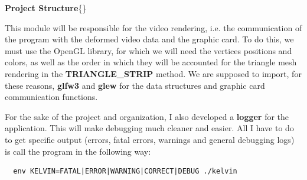 \documentclass[12pt, a4paper]{report}
\newenvironment{loggentry}[2]%
{\noindent\textbf{#2}\newline\{\marginnote{#1}\}\newline\\}{\vspace{1.0cm}}
\begin{document}
\begin{loggentry}{(01 - 03)-06-2019}{Project Structure}
\begin{itemize}
			This module will be responsible for the video rendering, i.e. the communication of the program with the deformed  video data and the graphic card. To do this, we must use the OpenGL library, for which we will need the vertices positions and colors, as well as the order in which they will be accounted for the triangle mesh rendering in the \textbf{TRIANGLE\_STRIP} method. We are supposed to import, for these reasons, \textbf{glfw3} and \textbf{glew} for the data structures and graphic card communication functions.

	\end{itemize}

	For the sake of the project and organization, I also developed a \textbf{logger} for the application. This will make debugging much cleaner and easier. All I have to do to get specific output (errors, fatal errors, warnings and general debugging logs) is call the program in the following way:

\lstset{
  language=bash,
  basicstyle=\ttfamily
}

\begin{lstlisting}
  env KELVIN=FATAL|ERROR|WARNING|CORRECT|DEBUG ./kelvin
\end{lstlisting}

\end{loggentry}
\end{document}
